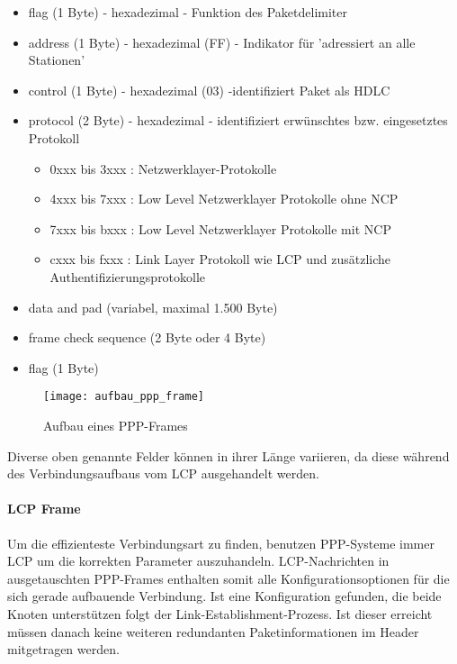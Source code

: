 \begin{itemize}
\item flag (1 Byte) - hexadezimal - Funktion des Paketdelimiter
\item address (1 Byte) - hexadezimal (FF) - Indikator für 'adressiert an alle Stationen'
\item control (1 Byte) - hexadezimal (03) -identifiziert Paket als \ac{HDLC}
\item protocol (2 Byte) - hexadezimal - identifiziert erwünschtes bzw. eingesetztes Protokoll
	\begin{itemize}
		\item 0xxx bis 3xxx : Netzwerklayer-Protokolle
		\item 4xxx bis 7xxx : Low Level Netzwerklayer Protokolle ohne \ac{NCP}
		\item 7xxx bis bxxx : Low Level Netzwerklayer Protokolle mit \ac{NCP}
		\item cxxx bis fxxx : Link Layer Protokoll wie LCP und zusätzliche Authentifizierungsprotokolle
	\end{itemize}
\item data and pad (variabel, maximal 1.500 Byte)
\item frame check sequence (2 Byte oder 4 Byte)
\item flag (1 Byte)
\end{itemize}

 \begin{figure}[htp]
  \begin{center}
   \texttt{[image: aufbau\_ppp\_frame]}
  \end{center}
  \caption[Aufbau eines PPP-Frames]{Aufbau eines PPP-Frames \cite{tcpipillustrated}}
  \label{abb:aufbau_ppp_frame}
 \end{figure}

Diverse oben genannte Felder können in ihrer Länge variieren, da 
diese während des Verbindungsaufbaus vom \ac{LCP} ausgehandelt werden.

\paragraph{LCP Frame} Um die effizienteste Verbindungsart zu finden, benutzen PPP-Systeme
immer \ac{LCP} um die korrekten Parameter auszuhandeln. LCP-Nachrichten in ausgetauschten
PPP-Frames enthalten somit alle Konfigurationsoptionen für die sich gerade aufbauende
Verbindung. Ist eine Konfiguration gefunden, die beide Knoten unterstützen folgt der
Link-Establishment-Prozess. Ist dieser erreicht müssen danach keine weiteren redundanten
Paketinformationen im Header mitgetragen werden.

